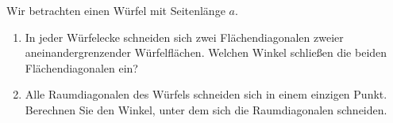 \begin{ExerciseBlock}
Wir betrachten einen Würfel mit Seitenlänge $a$.
\begin{enumerate}[label=\alph*)]
	\item In jeder Würfelecke schneiden sich zwei Flächendiagonalen zweier aneinandergrenzender Würfelflächen. Welchen Winkel schlie{\ss}en die beiden Flächendiagonalen ein?
	\item Alle Raumdiagonalen des Würfels schneiden sich in einem einzigen Punkt. Berechnen Sie den Winkel, unter dem sich die Raumdiagonalen schneiden.
\end{enumerate}

\end{ExerciseBlock}
